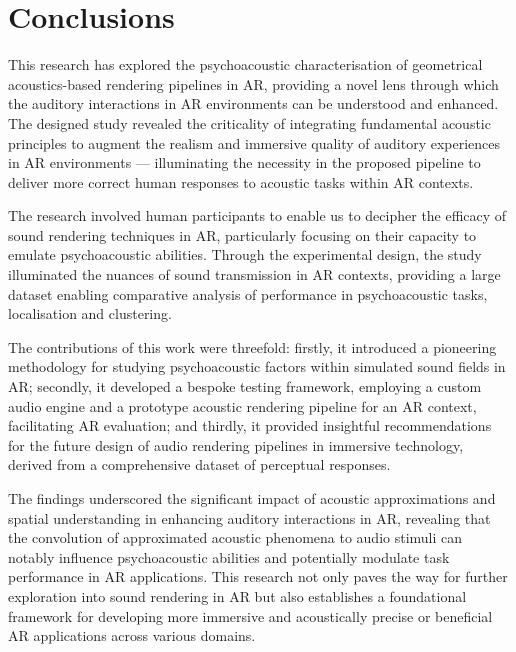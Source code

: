 \section{Conclusions}
This research has explored the psychoacoustic characterisation of geometrical acoustics-based rendering pipelines in AR, providing a novel lens through which the auditory interactions in AR environments can be understood and enhanced. The designed study revealed the criticality of integrating fundamental acoustic principles to augment the realism and immersive quality of auditory experiences in AR environments --- illuminating the necessity in the proposed pipeline to deliver more correct human responses to acoustic tasks within AR contexts. \par
The research involved human participants to enable us to decipher the efficacy of sound rendering techniques in AR, particularly focusing on their capacity to emulate psychoacoustic abilities. Through the experimental design, the study illuminated the nuances of sound transmission in AR contexts, providing a large dataset enabling comparative analysis of performance in psychoacoustic tasks, localisation and clustering. \par
The contributions of this work were threefold: firstly, it introduced a pioneering methodology for studying psychoacoustic factors within simulated sound fields in AR; secondly, it developed a bespoke testing framework, employing a custom audio engine and a prototype acoustic rendering pipeline for an AR context, facilitating AR evaluation; and thirdly, it provided insightful recommendations for the future design of audio rendering pipelines in immersive technology, derived from a comprehensive dataset of perceptual responses. \par
The findings underscored the significant impact of acoustic approximations and spatial understanding in enhancing auditory interactions in AR, revealing that the convolution of approximated acoustic phenomena to audio stimuli can notably influence psychoacoustic abilities and potentially modulate task performance in AR applications. This research not only paves the way for further exploration into sound rendering in AR but also establishes a foundational framework for developing more immersive and acoustically precise or beneficial AR applications across various domains. \par
